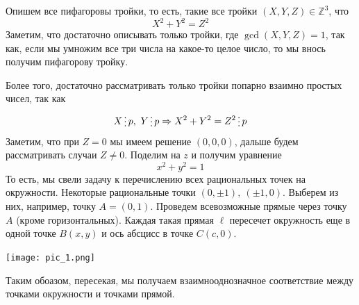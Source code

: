 \documentclass[11pt]{article}
\begin{document}
    \begin{example} Опишем все пифагоровы тройки, то есть, такие все тройки $(X, Y, Z) \in \mathbb{Z}^3$, что
        \[ X^2 + Y^2 = Z^2 \]
        Заметим, что достаточно описывать только тройки, где $\gcd(X, Y, Z) = 1$, так как, если мы умножим все три числа на какое-то
        целое число, то мы внось получим пифагорову тройку.

        Более того, достаточно рассматривать только тройки попарно взаимно простых чисел, так как
        \[ X \divisible p, \ Y \divisible p \Rightarrow X^2 + Y^2 = Z^2 \divisible p \]
        Заметим, что при $Z = 0$ мы имеем решение $(0, 0, 0)$, дальше будем рассматривать случаи $Z \neq 0$.
        Поделим на $z$ и получим уравнение
        \[ x^2 + y^2 = 1 \]
        То есть, мы свели задачу к перечислению всех рациональных точек на окружности.
        Некоторые рациональные точки $(0, \pm 1), \ (\pm 1, 0)$. Выберем из них, например, точку $A = (0, 1)$.
        Проведем всевозможные прямые через точку $A$ (кроме горизонтальных).
        Каждая такая прямая $\ell$ пересечет окружность еще в одной точке $B(x, y)$ и ось абсцисс в точке $C(c, 0)$.
        
        \begin{center}
            \texttt{[image: pic\_1.png]}
        \end{center}

        Таким обоазом, пересекая, мы получаем взаимнооднозначное соответствие между точками окружности и точками прямой.


\end{example}
\end{document}
